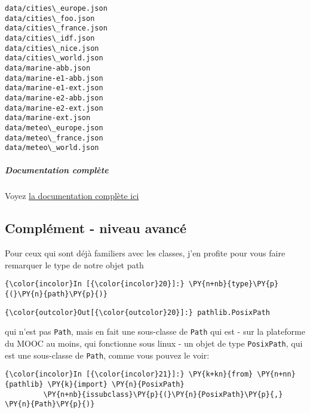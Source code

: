     \begin{Verbatim}[commandchars=\\\{\}]
data/cities\_europe.json
data/cities\_foo.json
data/cities\_france.json
data/cities\_idf.json
data/cities\_nice.json
data/cities\_world.json
data/marine-abb.json
data/marine-e1-abb.json
data/marine-e1-ext.json
data/marine-e2-abb.json
data/marine-e2-ext.json
data/marine-ext.json
data/meteo\_europe.json
data/meteo\_france.json
data/meteo\_world.json

    \end{Verbatim}

    \hypertarget{documentation-compluxe8te}{%
\subparagraph{Documentation complète}\label{documentation-compluxe8te}}

    Voyez \href{https://docs.python.org/3/library/pathlib.html}{la
documentation complète ici}

    \hypertarget{compluxe9ment---niveau-avancuxe9}{%
\subsection{Complément - niveau
avancé}\label{compluxe9ment---niveau-avancuxe9}}

    Pour ceux qui sont déjà familiers avec les classes, j'en profite pour
vous faire remarquer le type de notre objet path

    \begin{Verbatim}[commandchars=\\\{\}]
{\color{incolor}In [{\color{incolor}20}]:} \PY{n+nb}{type}\PY{p}{(}\PY{n}{path}\PY{p}{)}
\end{Verbatim}


\begin{Verbatim}[commandchars=\\\{\}]
{\color{outcolor}Out[{\color{outcolor}20}]:} pathlib.PosixPath
\end{Verbatim}
            
    qui n'est pas \texttt{Path}, mais en fait une sous-classe de
\texttt{Path} qui est - sur la plateforme du MOOC au moins, qui
fonctionne sous linux - un objet de type \texttt{PosixPath}, qui est une
sous-classe de \texttt{Path}, comme vous pouvez le voir:

    \begin{Verbatim}[commandchars=\\\{\}]
{\color{incolor}In [{\color{incolor}21}]:} \PY{k+kn}{from} \PY{n+nn}{pathlib} \PY{k}{import} \PY{n}{PosixPath}
         \PY{n+nb}{issubclass}\PY{p}{(}\PY{n}{PosixPath}\PY{p}{,} \PY{n}{Path}\PY{p}{)}
\end{Verbatim}


